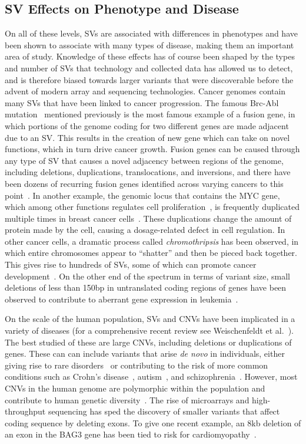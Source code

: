 \subsection{SV Effects on Phenotype and Disease}

On all of these levels, SVs are associated with differences in phenotypes and have been shown to associate with many types of disease, making them an important area of study. Knowledge of these effects has of course been shaped by the types and number of SVs that technology and collected data has allowed us to detect, and is therefore biased towards larger variants that were discoverable before the advent of modern array and sequencing technologies. 
Cancer genomes contain many SVs that have been linked to cancer progression. The famous Brc-Abl mutation~\cite{Kurzrock:2003bz} mentioned previously is the most famous example of a fusion gene, in which portions of the genome coding for two different genes are made adjacent due to an SV. This results in the creation of new gene which can take on novel functions, which in turn drive cancer growth. Fusion genes can be caused through any type of SV that causes a novel adjacency between regions of the genome, including deletions, duplications, translocations, and inversions, and there have been dozens of recurring fusion genes identified across varying cancers to this point~\cite{Annala:2013ks}. In another example, the genomic locus that contains the MYC gene, which among other functions regulates cell proliferation~\cite{Eilers:2008jk}, is frequently duplicated multiple times in breast cancer cells~\cite{Escot:1986tn}. These duplications change the amount of protein made by the cell, causing a dosage-related defect in cell regulation. In other cancer cells, a dramatic process called \emph{chromothripsis} has been observed, in which entire chromosomes appear to ``shatter'' and then be pieced back together. This gives rise to hundreds of SVs, some of which can promote cancer development~\cite{Stephens:2011bm}. On the other end of the spectrum in terms of variant size, small deletions of less than 150bp in untranslated coding regions of genes have been observed to contribute to aberrant gene expression in leukemia~\cite{Hosokawa:1998wi}.

On the scale of the human population, SVs and CNVs have been implicated in a variety of diseases (for a comprehensive recent review see Weischenfeldt et al.~\cite{Weischenfeldt:2013fm}). The best studied of these are large CNVs, including deletions or duplications of genes. These can can include variants that arise \emph{de novo} in individuals, either giving rise to rare disorders~\cite{Lupski:1998ip} or contributing to the risk of more common conditions such as Crohn's disease~\cite{McCarroll:2008jt}, autism~\cite{Sebat:2007bs}, and schizophrenia~\cite{Walsh:2008kp}. However, most CNVs in the human genome are polymorphic within the population and contribute to human genetic diversity~\cite{McCarroll:2008p265}. The rise of microarrays and high-throughput sequencing has sped the discovery of smaller variants that affect coding sequence by deleting exons. To give one recent example, an 8kb deletion of an exon in the BAG3 gene has been tied to risk for cardiomyopathy~\cite{Norton:2011ev}. 

